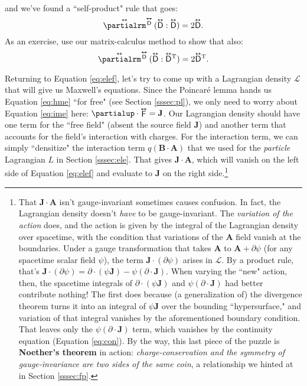 \documentclass[12pt]{article}
\renewcommand{\vv}[1]{\mathbf{#1}}
\newcommand{\tightoverset}[2]{%
  \mathop{#2}\limits^{\vbox to -.5ex{\kern-0.75ex\hbox{$#1$}\vss}}}
\newcommand{\inlinedy}[1]{\tightoverset{\text{\tiny$\bm\leftrightarrow$}}{#1}}
\newcommand{\superoverset}[2]{%
  \mathop{#2}\limits^{\vbox to -.5ex{\kern-0.95ex\hbox{$#1$}\vss}}}
\newcommand{\superdy}[1]{\superoverset{\text{\tiny$\bm\leftrightarrow$}}{#1}}
\newcommand{\capdy}[1]{ \overset{ \text{\tiny$\bm\leftrightarrow$} }{\vphantom{\text{\small{A}}}\smash{#1}} }
\begin{document}
and we've found a ``self-product" rule that goes:
\begin{equation}\label{eq:dyoprule1}
\capdy{\partialrm} {}^{\superdy{\mathsf{D}}} \, ( \capdy{\mathsf{D}} : \capdy{\mathsf{D}} ) = 2 \capdy{\mathsf{D}}.
\end{equation}
As an exercise, use our matrix-calculus method to show that also:
 \begin{equation}\label{eq:dyoprule2}
\capdy{\partialrm} {}^{\superdy{\mathsf{D}}} \, ( \capdy{\mathsf{D}} : \capdy{\mathsf{D}} {}^\mathrm{T} ) = 2 \capdy{\mathsf{D}} {}^\mathrm{T}.
\end{equation}

Returning to Equation \ref{eq:elef}, let's try to come up with a Lagrangian density $\mathcal{L}$ that will give us Maxwell's equations. Since the Poincar\'e lemma hands us Equation \ref{eq:hme} ``for free" (see Section \ref{sssec:pl}), we only need to worry about Equation \ref{eq:ime} here: $\partialup \cdot \inlinedy{\mathsf{F}} = \vv J$. Our Lagrangian density should have one term for the ``free field" (absent the source field $\vv J$) and another term that accounts for the field's interaction with charges. For the interaction term, we can simply ``densitize" the interaction term $q (\vv B \cdot \vv A)$ that we used for the \emph{particle} Lagrangian $L$ in Section \ref{sssec:ele}. That gives $\vv J \cdot \vv A$, which will vanish on the left side of Equation \ref{eq:elef} and evaluate to $\vv J$ on the right side.\footnote{That $\vv J \cdot \vv A$ isn't gauge-invariant sometimes causes confusion. In fact, the Lagrangian density doesn't \emph{have} to be gauge-invariant. The \emph{variation of the action} does, and the action is given by the integral of the Lagrangian density over spacetime, with the condition that variations of the $\vv A$ field vanish at the boundaries. Under a gauge transformation that takes $\vv A$ to $\vv A + \partialup \psi$ (for any spacetime scalar field $\psi$), the term $\vv J \cdot ( \partialup \psi )$ arises in $\mathcal{L}$. By a product rule, that's $\vv J \cdot ( \partialup \psi ) = \partialup \cdot (\psi \vv J) - \psi  ( \partialup \cdot \vv J )$. When varying the ``new" action, then, the spacetime integrals of $\partialup \cdot (\psi \vv J)$ and $\psi ( \partialup \cdot \vv J )$ had better contribute nothing! The first does because (a generalization of) the divergence theorem turns it into an integral of $\psi \vv J$ over the bounding ``hypersurface," and variation of that integral vanishes by the aforementioned boundary condition. That leaves only the $\psi ( \partialup \cdot \vv J )$ term, which vanishes by the continuity equation (Equation \ref{eq:con}). By the way, this last piece of the puzzle is \textbf{Noether's theorem} in action: \emph{charge-conservation and the symmetry of gauge-invariance are two sides of the same coin}, a relationship we hinted at in Section \ref{sssec:fp}.}
\end{document}
